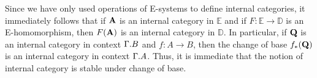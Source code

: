 \begin{rmk}
Since we have only used operations of E-systems to define internal categories,
it immediately follows that if $\mathbf{A}$ is an internal category in
$\mathbb{E}$ and if $F:\mathbb{E}\to\mathbb{D}$ is an E-homomorphism, then
$F(\mathbf{A})$ is an internal category in $\mathbb{D}$. In particular, if
$\mathbf{Q}$ is an internal category in context $\ctxext{\Gamma}{B}$ and
$f:A\to B$, then the change of base $f_\ast(\mathbf{Q})$ is an internal category
in context $\ctxext{\Gamma}{A}$. Thus, it is immediate that the notion of
internal category is stable under change of base.
\end{rmk}

\begin{comment}
\section{Dependent morphisms}

\begin{defn}
Let $f_0\in\thom{A}{B}$ be an internal morphism and let $P\in\cat{C}/\ctxext{\Gamma}{A}$ and
$Q\in\cat{C}/\ctxext{\Gamma}{B}$. We define
\begin{equation*}
\thomd{f_0}{P}{Q} \defeq \thom{P}{{f_0}_\ast(Q)}
\end{equation*}
We indicate that $f_1\in\thomd{f_0}{P}{Q}$ by drawing the diagram
\begin{equation*}
\begin{tikzcd}
P \arrow[r,"f_1"] \arrow[d,->>] & Q \arrow[d,->>] \\
A \arrow[r,swap,"f_0"] & B.
\end{tikzcd}
\end{equation*}
\end{defn}

\begin{defn}
Consider the diagram
\begin{equation*}
\begin{tikzcd}
P \arrow[r,"f_1"] \arrow[d,->>] & Q \arrow[d,->>] \arrow[r,"g_1"] & R \arrow[d,->>] \\
A \arrow[r,swap,"f_0"] & B \arrow[r,"g_0"] & C.
\end{tikzcd}
\end{equation*}
We define
\begin{align*}
\jvcomp{P}{f_0}{f_1} & \defeq\unfold\jvcomp{P}{f_0}{f_1} & & \in \thom{\ctxext{A}{P}}{\ctxext{B}{Q}} \\
\jfcomp{A}{f_0}{P}{f_1}{g_1} & \defeq \unfold\jfcomp{A}{f_0}{P}{f_1}{g_1} & & \in \thomd{\jcomp{A}{f_0}{g_0}}{P}{R}.
\end{align*}
\end{defn}


\end{comment}

